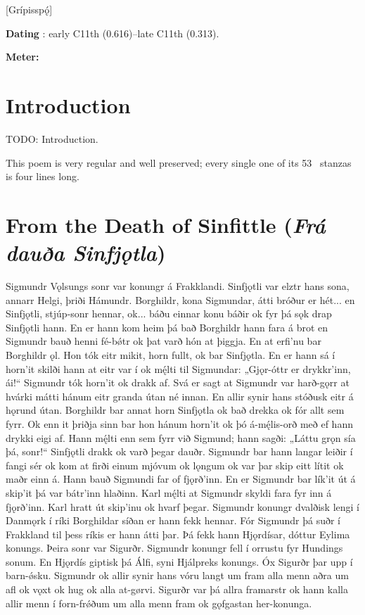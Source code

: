 [Grípisspǫ́]

\begin{flushright}%
\textbf{Dating} \parencite{Sapp2022}: early C11th (0.616)–late C11th (0.313).

\textbf{Meter:} \Fornyrdislag%
\end{flushright}

\section{Introduction}

TODO: Introduction.

This poem is very regular and well preserved; every single one of its 53 \Fornyrdislag\ stanzas is four lines long.

\section{From the Death of Sinfittle (\emph{Frá dauða Sinfjǫtla})}

\sectionline

\bpg\bpa Sigmundr Vǫlsungs sonr var konungr á Frakklandi. Sinfjǫtli var elztr hans sona, annarr Helgi, þriði Hámundr. Borghildr, kona Sigmundar, átti bróður er hét... en Sinfjǫtli, stjúp-sonr hennar, ok... báðu einnar konu báðir ok fyr þá sǫk drap Sinfjǫtli hann. En er hann kom heim þá bað Borghildr hann fara á brot en Sigmundr bauð henni fé-bǿtr ok þat varð hón at þiggja. En at erfi’nu bar Borghildr ǫl. Hon tók eitr mikit, horn fullt, ok bar Sinfjǫtla.  En er hann sá í horn’it skilði hann at eitr var í ok mę́lti til Sigmundar: „Gjǫr-óttr er drykkr’inn, ái!“  Sigmundr tók horn’it ok drakk af.  Svá er sagt at Sigmundr var harð-gǫrr at hvárki mátti hánum eitr granda útan né innan.  En allir synir hans stóðusk eitr á hǫrund útan.  Borghildr bar annat horn Sinfjǫtla ok bað drekka ok fór allt sem fyrr.  Ok enn it þriðja sinn bar hon hánum horn’it ok þó á-mę́lis-orð með ef hann drykki eigi af.  Hann mę́lti enn sem fyrr við Sigmund; hann sagði: „Láttu grǫn sía þá, sonr!“  Sinfjǫtli drakk ok varð þegar dauðr.  Sigmundr bar hann langar leiðir í fangi sér ok kom at firði einum mjóvum ok lǫngum ok var þar skip eitt lítit ok maðr einn á.  Hann bauð Sigmundi far of fjǫrð’inn.  En er Sigmundr bar lík’it út á skip’it þá var bátr’inn hlaðinn.  Karl mę́lti at Sigmundr skyldi fara fyr inn á fjǫrð’inn.  Karl hratt út skip’inu ok hvarf þegar.  Sigmundr konungr dvalðisk lengi í Danmǫrk í ríki Borghildar síðan er hann fekk hennar.  Fór Sigmundr þá suðr í Frakkland til þess ríkis er hann átti þar.  Þá fekk hann Hjǫrdísar, dóttur Eylima konungs.  Þeira sonr var Sigurðr.  Sigmundr konungr fell í orrustu fyr Hundings sonum.  En Hjǫrdís giptisk þá Álfi, syni Hjálpreks konungs.  Óx Sigurðr þar upp í barn-ǿsku.  Sigmundr ok allir synir hans vóru langt um fram alla menn aðra um afl ok vǫxt ok hug ok alla at-gørvi.  Sigurðr var þá allra framarstr ok hann kalla allir menn í forn-frǿðum um alla menn fram ok gǫfgastan her-konunga.\epa

